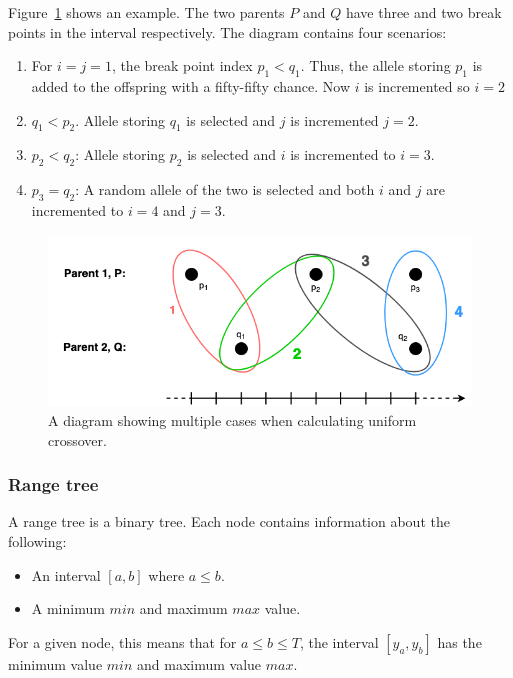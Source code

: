 \begin{description}
    Figure~\ref{fig:uniform-crossover} shows an example. The two parents $P$ and
    $Q$ have three and two break points in the interval respectively. The
    diagram contains four scenarios:
    
    \begin{enumerate}
        \item For $i = j = 1$, the break point index $p_1 < q_1$. Thus, the
        allele storing $p_1$ is added to the offspring with a fifty-fifty
        chance. Now $i$ is incremented so $i = 2$ 
        
        \item $q_1 < p_2$. Allele storing $q_1$ is selected and $j$ is
        incremented $j = 2$. 
        
        \item $p_2 < q_2$: Allele storing $p_2$ is selected and $i$ is
        incremented to $i = 3$. 
        
        \item $p_3 = q_2$: A random allele of the two is selected and both $i$
        and $j$ are incremented to $i = 4$ and $j = 3$. 
    \end{enumerate}
    
\end{description}

\begin{figure}[h]
    \centering
    \includegraphics[width=.8\textwidth]{fig/uniform-crossover.png}
    \caption{A diagram showing multiple cases when calculating uniform crossover.}
    \label{fig:uniform-crossover}
\end{figure}

\subsubsection{Range tree}

A range tree is a binary tree. Each node contains information about the following:
\begin{itemize}
    \item An interval $[a,b]$ where $a \leq b$. 
    \item A minimum $min$ and maximum $max$ value. 
\end{itemize}
For a given node, this means that for $a \leq b \leq T$, the interval
$[y_a,y_b]$ has the minimum value $min$ and maximum value $max$. 


